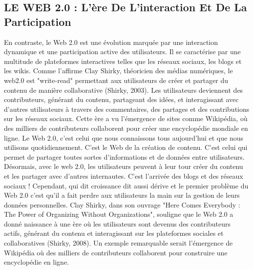 \documentclass[12pt,a4paper]{article} %
\begin{document}
	\subsection{\textbf{LE WEB 2.0 : L’ère De L'interaction Et De La Participation}}
	En contraste, le Web 2.0 est une évolution marquée par une interaction dynamique et une participation active des utilisateurs. Il se caractérise par une multitude de plateformes interactives telles que les réseaux sociaux, les blogs et les wikis. Comme l'affirme Clay Shirky, théoricien des médias numériques, le web2.0 est "write-read" permettant aux utilisateurs de créer et partager du contenu de manière collaborative (Shirky, 2003). Les utilisateurs deviennent des contributeurs, générant du contenu, partageant des idées, et interagissant avec d'autres utilisateurs à travers des commentaires, des partages et des contributions sur les réseaux sociaux. Cette ère a vu l'émergence de sites comme Wikipédia, où des milliers de contributeurs collaborent pour créer une encyclopédie mondiale en ligne.
	Le Web 2.0, c’est celui que nous connaissons tous aujourd’hui et que nous utilisons quotidiennement. C’est le Web de la création de contenu. C’est celui qui permet de partager toutes sortes d’informations et de données entre utilisateurs. Désormais, avec le web 2.0, les utilisateurs peuvent à leur tour créer du contenu et les partager avec d’autres internautes. C’est l’arrivée des blogs et des réseaux sociaux ! Cependant, qui dit croissance dit aussi dérive et le premier problème du Web 2.0 c’est qu’il a fait perdre aux utilisateurs la main sur la gestion de leurs données personnelles.
	Clay Shirky, dans son ouvrage "Here Comes Everybody : The Power of Organizing Without Organizations", souligne que le Web 2.0 a donné naissance à une ère où les utilisateurs sont devenus des contributeurs actifs, générant du contenu et interagissant sur les plateformes sociales et collaboratives (Shirky, 2008). Un exemple remarquable serait l'émergence de Wikipédia où des milliers de contributeurs collaborent pour construire une encyclopédie en ligne.
\end{document}
